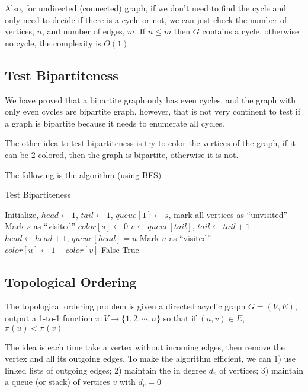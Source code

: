 					Also, for undirected (connected) graph, if we don't need to find the cycle and only need to decide if there is a cycle or not, we can just check the number of vertices, $n$, and number of edges, $m$. If $n \le m$ then $G$ contains a cycle, otherwise no cycle, the complexity is $O(1)$.

				\subsection{Test Bipartiteness}
					We have proved that a bipartite graph only has even cycles, and the graph with only even cycles are bipartite graph, however, that is not very continent to test if a graph is bipartite because it needs to enumerate all cycles.

					The other idea to test bipartiteness is try to color the vertices of the graph, if it can be 2-colored, then the graph is bipartite, otherwise it is not.

					The following is the algorithm (using BFS)
					\begin{algorithm}[h]
						\caption{Test Bipartiteness}
						\begin{algorithmic}[1]
							\State Initialize, $head \gets 1$, $tail \gets 1$, $queue[1] \gets s$, mark all vertices as ``unvisited''
							\State Mark $s$ as ``visited''
							\State $color[s] \gets 0$
							\While {$head \ge tail$}
								\State $v \gets queue[tail]$, $tail \gets tail + 1$
										\State $head \gets head + 1$, $queue[head] = u$
										\State Mark $u$ as ``visited''
										\State $color[u] \gets 1 - color[v]$
									\Else
											\Return False
										\EndIf
									\EndIf
								\EndFor
							\EndWhile
							\Return True
						\end{algorithmic}
					\end{algorithm}

				\subsection{Topological Ordering}
					The topological ordering problem is given a directed acyclic graph $G = (V, E)$, output a 1-to-1 function $\pi: V\rightarrow\{1, 2, \cdots, n\}$ so that if $(u, v) \in E$, $\pi(u) < \pi(v)$

					The idea is each time take a vertex without incoming edges, then remove the vertex and all its outgoing edges. To make the algorithm efficient, we can 1) use linked lists of outgoing edges; 2) maintain the in degree $d_v$ of vertices; 3) maintain a queue (or stack) of vertices $v$ with $d_v = 0$

